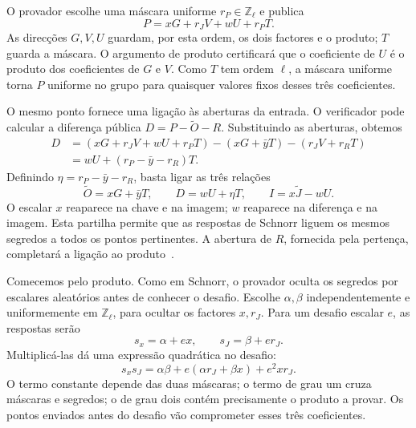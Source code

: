 O provador escolhe uma máscara uniforme \(r_P\in\mathbb Z_\ell\)
e publica
\begin{equation}
 P=xG+r_JV+wU+r_PT.
 \label{eq:fcmp-sal-P}
\end{equation}
As direcções \(G,V,U\) guardam, por esta ordem, os dois factores
e o produto; \(T\) guarda a máscara. O argumento de produto
certificará que o coeficiente de \(U\) é o produto dos coeficientes
de \(G\) e \(V\). Como \(T\) tem ordem \(\ell\), a máscara
uniforme torna \(P\) uniforme no grupo para quaisquer valores
fixos desses três coeficientes.

O mesmo ponto fornece uma ligação às aberturas da entrada. O
verificador pode calcular a diferença pública
\(D=P-\widetilde O-R\). Substituindo as aberturas, obtemos
\begin{align*}
 D&=(xG+r_JV+wU+r_PT)
       -(xG+\bar yT)-(r_JV+r_RT)\\
  &=wU+(r_P-\bar y-r_R)T.
\end{align*}
Definindo \(\eta=r_P-\bar y-r_R\), basta ligar as três relações
\begin{equation}
 \widetilde O=xG+\bar yT,\qquad
 D=wU+\eta T,\qquad
 I=x\widetilde J-wU.
 \label{eq:fcmp-sal-linear-relations}
\end{equation}
O escalar \(x\) reaparece na chave e na imagem; \(w\) reaparece
na diferença e na imagem. Esta partilha permite que as respostas
de Schnorr liguem os mesmos segredos a todos os pontos pertinentes.
A abertura de \(R\), fornecida pela pertença, completará a
ligação ao produto~\cite{fcmp-composition-review}.


Comecemos pelo produto. Como em Schnorr, o provador oculta os
segredos por escalares aleatórios antes de conhecer o desafio.
Escolhe \(\alpha,\beta\) independentemente e uniformemente em
\(\mathbb Z_\ell\), para ocultar os factores \(x,r_J\).
Para um desafio escalar \(e\), as respostas serão
\[
 s_x=\alpha+ex,\qquad s_J=\beta+er_J.
\]
Multiplicá-las dá uma expressão quadrática no desafio:
\begin{equation}
 s_xs_J=\alpha\beta
       +e(\alpha r_J+\beta x)+e^2xr_J.
 \label{eq:fcmp-sal-quadratic}
\end{equation}
O termo constante depende das duas máscaras; o termo de grau um
cruza máscaras e segredos; o de grau dois contém precisamente o
produto a provar. Os pontos enviados antes do desafio vão
comprometer esses três coeficientes.

